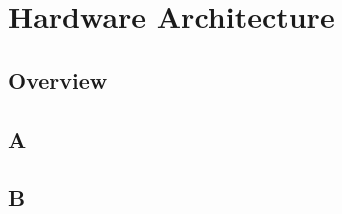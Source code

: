 \section{Hardware Architecture}
\label{sec:hardware}

\subsection{Overview}

\subsection{A}

\subsection{B}